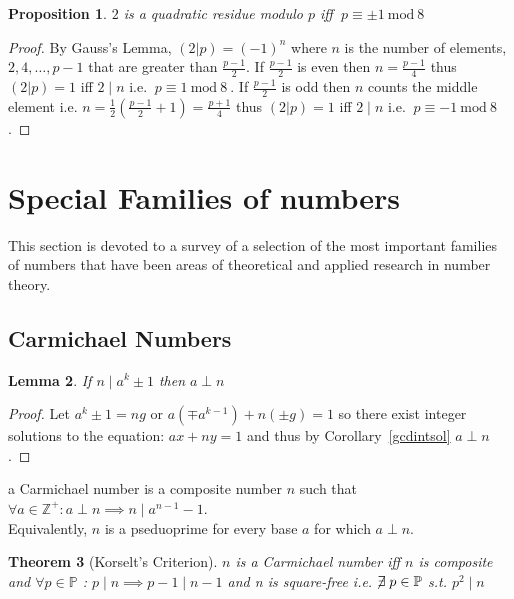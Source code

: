 \documentclass[12pt]{extarticle}
\renewcommand\qedsymbol{$\square$}
\newcommand{\divides}{\mid}
\newcommand{\Zplus}{\mathbb{Z}^{+}}
\newcommand{\Primes}{\mathbb{P}}
\newtheorem{theorem}{Theorem}[section]
\newtheorem{lemma}[theorem]{Lemma}
\newtheorem{proposition}[theorem]{Proposition}
\newenvironment{definition}[1][Definition:]{\begin{trivlist}
\item[\hskip \labelsep {\bfseries #1}]}{\end{trivlist}}
\newenvironment{lproof}{\begin{proof} \renewcommand{\qedsymbol}{}}{\end{proof}}
\renewcommand{\mod}[3]{\: #1 \equiv #2 \: \mathrm{mod} \: #3 \:}
\begin{document}
\begin{proposition}
\label{quadres2}
$2$ is a quadratic residue modulo $p$ iff $\mod{p}{\pm 1}{8}$
\end{proposition}

\begin{lproof}
By Gauss's Lemma, $(2|p) = (-1)^n$ where $n$ is the number of elements, \\ $2, 4, \dots, p-1$ that are greater than $\frac{p-1}{2}$. If $\frac{p-1}{2}$ is even then $n = \frac{p-1}{4}$ thus $(2|p) = 1$ iff $2 \divides n$ i.e. $\mod{p}{1}{8}$. If $\frac{p-1}{2}$ is odd then $n$ counts the middle element i.e. $n = \frac{1}{2}(\frac{p-1}{2} + 1) = \frac{p+1}{4}$ thus $(2|p) = 1$ iff $2 \divides n$ i.e. $\mod{p}{-1}{8}$.
\end{lproof}

\newpage
\section{Special Families of numbers}
This section is devoted to a survey of a selection of the most important families of numbers that have been areas of theoretical and applied research in number theory.
\subsection{Carmichael Numbers}

\begin{lemma}
\label{coprimeifdividespowerminusone}
If $n \divides a^k \pm 1$ then $a \perp n$
\end{lemma}

\begin{lproof}
Let $a^k \pm 1 = ng$ or $a (\mp  a^{k-1}) + n   (\pm g) = 1$ so there exist integer solutions to the equation: $ax + ny = 1$ and thus by Corollary~\ref{gcdintsol} $a \perp n$.
\end{lproof}

\begin{definition} a Carmichael number is a composite number $n$ such that \\ $\forall a \in \Zplus : a \perp n \implies n \divides a^{n-1} - 1$.\\
Equivalently, $n$ is a pseduoprime for every base $a$ for which $a \perp n$.
\end{definition}

\begin{theorem}[Korselt's Criterion]
$n$ is a Carmichael number iff $n$ is composite and $\forall p \in \Primes$ : $p \divides n \implies p-1 \divides n-1$ and n is square-free i.e. $\centernot \exists p \in \Primes$ s.t. $p^2 \divides n$
\end{theorem}
\end{document}
